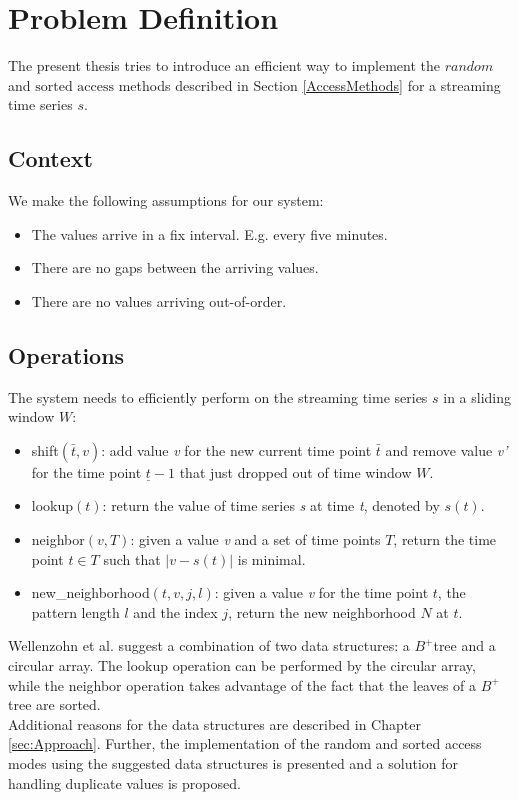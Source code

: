 \documentclass[abstracton,12pt]{scrreprt}
\begin{document}
\chapter{Problem Definition}
\label{ProblemDefinition}
The present thesis tries to introduce an efficient way to implement the $random$ and $\text{sorted access}$ methods described in Section \ref{AccessMethods} for a streaming time series $s$.

\section{Context}
We make the following assumptions for our system: 
\begin{itemize}  
	\item The values arrive in a fix interval. E.g. every five minutes. 
	\item There are no gaps between the arriving values. 
	\item There are no values arriving out-of-order. 
\end{itemize}


\section{Operations}
\label{sec:Op}
The system needs to efficiently perform on the streaming time series $s$ in a sliding window $W$: 
\begin{itemize}  
	\item shift$(\bar{t}, v)$: add value \emph{v} for the new current time point $\bar{t}$ and remove value \emph{v'} for the time point $\underline{t} - 1$ that just dropped out of time window $W$.
	\item lookup$(t)$: return the value of time series \emph{s} at time \emph{t}, denoted by $s(t)$.
	\item neighbor$(v, T)$: given a value \emph{v} and a set of time points $T$, return the time point $t \in T$ such that $|v-s(t)|$ is minimal.
	\item new\_neighborhood$(t,v,j,l)$: given a value \emph{v} for the time point $t$, the pattern length $l$ and the index $j$, return the new neighborhood $N$ at $t$.
\end{itemize}
Wellenzohn et al.\cite{BScT} suggest a combination of two data structures: a $B^+$tree and a circular array. The lookup operation can be performed by the circular array, while the neighbor operation takes advantage of the fact that the leaves of a $B^+$tree are sorted. \\Additional reasons for the data structures are described in Chapter \ref{sec:Approach}. Further, the implementation of the random and sorted access modes using the suggested data structures is presented and a solution for  handling duplicate values is proposed. 
\end{document}
